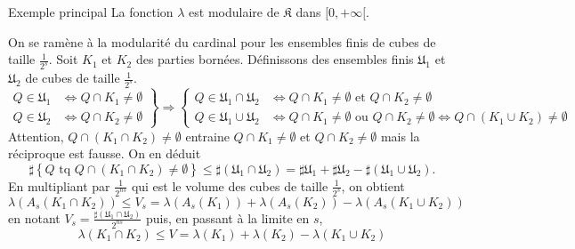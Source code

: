  \begin{propn}{Exemple principal}\label{ExplePpalModul}
  La fonction $\lambda$ est modulaire de $\mathfrak{K}$ dans $[0, + \infty[$.
 \end{propn}
 \begin{demo}
 On se ramène à la modularité du cardinal pour les ensembles finis de cubes de taille $\frac{1}{2^s}$. Soit $K_1$ et $K_2$ des parties bornées. Définissons des ensembles finis $\mathfrak{U}_1$ et $\mathfrak{U}_2$ de cubes de taille $\frac{1}{2^s}$.
 \begin{displaymath}
  \left.
  \begin{aligned}
    Q \in \mathfrak{U}_1 &\Leftrightarrow Q \cap K_1 \neq \emptyset \\
    Q \in \mathfrak{U}_2 &\Leftrightarrow Q \cap K_2 \neq \emptyset
  \end{aligned}
  \right\rbrace \Rightarrow
  \left\lbrace
  \begin{aligned}
   Q \in \mathfrak{U}_1\cap \mathfrak{U}_2 &\Leftrightarrow Q \cap K_1 \neq \emptyset \text{ et } Q \cap K_2 \neq \emptyset \\
   Q \in \mathfrak{U}_1\cup \mathfrak{U}_2 &\Leftrightarrow Q \cap K_1 \neq \emptyset \text{ ou } Q \cap K_2 \neq \emptyset \Leftrightarrow Q\cap(K_1 \cup K_2) \neq \emptyset
  \end{aligned}
  \right.
 \end{displaymath}
Attention, $Q\cap(K_1\cap K_2) \neq \emptyset$ entraine $Q \cap K_1 \neq \emptyset$ et $Q \cap K_2 \neq \emptyset$ mais la réciproque est fausse. On en déduit
\begin{displaymath}
 \sharp \left\lbrace Q \text{ tq } Q\cap(K_1\cap K_2) \neq \emptyset\right\rbrace
 \leq \sharp (\mathfrak{U}_1\cap \mathfrak{U}_2)
 = \sharp \mathfrak{U}_1 + \sharp \mathfrak{U}_2 - \sharp (\mathfrak{U}_1\cup \mathfrak{U}_2).
\end{displaymath}
En multipliant par $\frac{1}{2^{ns}}$ qui est le volume des cubes de taille $\frac{1}{2^s}$, on obtient
\begin{displaymath}
 \lambda(A_s(K_1\cap K_2))  \leq V_s = \lambda(A_s(K_1)) + \lambda(A_s(K_2)) - \lambda(A_s(K_1\cup K_2))
\end{displaymath}
en notant $V_s = \frac{\sharp (\mathfrak{U}_1\cap \mathfrak{U}_2)}{2^{ns}}$ puis, en passant à la limite en $s$,
\begin{displaymath}
 \lambda(K_1 \cap K_2) \leq V = \lambda(K_1) + \lambda(K_2) - \lambda(K_1 \cup K_2)
\end{displaymath}

\end{demo}
